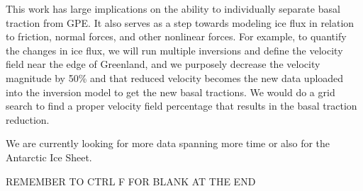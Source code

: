\documentclass{article}
\begin{document}
\cite{briner_rate_2020}

This work has large implications on the ability to individually separate basal traction from GPE. It also serves as a step towards modeling ice flux in relation to friction, normal forces, and other nonlinear forces. For example, to quantify the changes in ice flux, we will run multiple inversions and define the velocity field near the edge of Greenland, and we purposely decrease the velocity magnitude by 50\% and that reduced velocity becomes the new data uploaded into the inversion model to get the new basal tractions. We would do a grid search to find a proper velocity field percentage that results in the basal traction reduction.

We are currently looking for more data spanning more time or also for the Antarctic Ice Sheet.

REMEMBER TO CTRL F FOR BLANK AT THE END
\small


\end{document}

